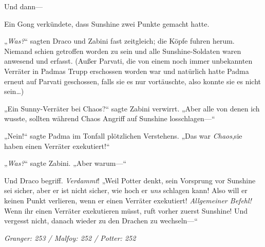 Und dann—

Ein Gong verkündete, dass Sunshine zwei Punkte gemacht hatte.

„\emph{Was?}“ sagten Draco und Zabini fast zeitgleich; die Köpfe fuhren herum. Niemand schien getroffen worden zu sein und alle Sunshine-Soldaten waren anwesend und erfasst. (Außer Parvati, die von einem noch immer unbekannten Verräter in Padmas Trupp erschossen worden war und natürlich hatte Padma erneut auf Parvati geschossen, falls sie es nur vortäuschte, also konnte sie es nicht sein…)

„Ein Sunny-Verräter bei Chaos?“ sagte Zabini verwirrt. „Aber alle von denen ich wusste, sollten während Chaos Angriff auf Sunshine losschlagen—“

„Nein!“ sagte Padma im Tonfall plötzlichen Verstehens. „Das war \emph{Chaos},sie haben einen Verräter exekutiert!“

„\emph{Was?}“ sagte Zabini. „Aber warum—“

Und Draco begriff. \emph{Verdammt}! „Weil Potter denkt, sein Vorsprung vor Sunshine sei sicher, aber er ist nicht sicher, wie hoch er \emph{uns} schlagen kann! Also will er keinen Punkt verlieren, wenn er einen Verräter exekutiert! \emph{Allgemeiner Befehl!} Wenn ihr einen Verräter exekutieren müsst, ruft vorher zuerst Sunshine! Und vergesst nicht, danach wieder zu den Drachen zu wechseln—“

\later

\emph{Granger: 253 / Malfoy: 252 / Potter: 252}

